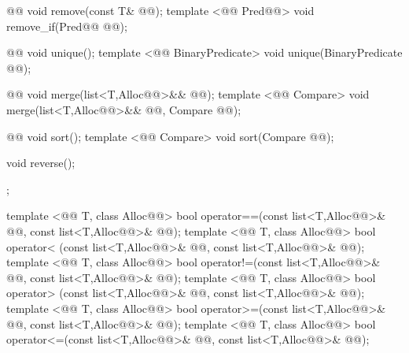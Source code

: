 \documentclass[american,twoside]{book}
\begin{document}
\begin{codeblock}
{{    @@ void remove(const T& @@);
    template <@@ Pred@@> void remove_if(Pred@@ @@);

    @@ void unique();
    template <@@ BinaryPredicate>
      void unique(BinaryPredicate @@);

    @@ void merge(list<T,Alloc@@>&& @@);
    template <@@ Compare> 
      void merge(list<T,Alloc@@>&& @@, Compare @@);

    @@ void sort();
    template <@@ Compare> 
      void sort(Compare @@);

    void reverse();
  };

  template <@@ T, class Alloc@@>
    bool operator==(const list<T,Alloc@@>& @@, const list<T,Alloc@@>& @@);
  template <@@ T, class Alloc@@>
    bool operator< (const list<T,Alloc@@>& @@, const list<T,Alloc@@>& @@);
  template <@@ T, class Alloc@@>
    bool operator!=(const list<T,Alloc@@>& @@, const list<T,Alloc@@>& @@);
  template <@@ T, class Alloc@@>
    bool operator> (const list<T,Alloc@@>& @@, const list<T,Alloc@@>& @@);
  template <@@ T, class Alloc@@>
    bool operator>=(const list<T,Alloc@@>& @@, const list<T,Alloc@@>& @@);
  template <@@ T, class Alloc@@>
    bool operator<=(const list<T,Alloc@@>& @@, const list<T,Alloc@@>& @@);

}
\end{codeblock}
\end{document}
